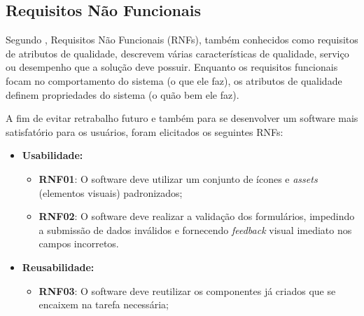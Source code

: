 \subsection[Requisitos Não Funcionais]{Requisitos Não Funcionais}
\label{requisitosNaoFuncionais}

Segundo , Requisitos Não Funcionais (RNFs), também conhecidos como requisitos de atributos de qualidade, descrevem várias características de qualidade, serviço ou desempenho que a solução deve possuir. Enquanto os requisitos funcionais focam no comportamento do sistema (o que ele faz), os atributos de qualidade definem propriedades do sistema (o quão bem ele faz).

A fim de evitar retrabalho futuro e também para se desenvolver um software mais satisfatório para os usuários, foram elicitados os seguintes RNFs:

\begin{itemize}

\item \textbf{Usabilidade:}

\begin{itemize}

\item \textbf{RNF01}: O software deve utilizar um conjunto de ícones e \textit{assets} (elementos visuais) padronizados;

\item \textbf{RNF02}: O software deve realizar a validação dos formulários, impedindo a submissão de dados inválidos e fornecendo \textit{feedback} visual imediato nos campos incorretos.

\end{itemize}

\end{itemize}

\begin{itemize}

\item \textbf{Reusabilidade:}

\begin{itemize}

\item \textbf{RNF03}: O software deve reutilizar os componentes já criados que se encaixem na tarefa necessária;

\end{itemize}

\end{itemize}


